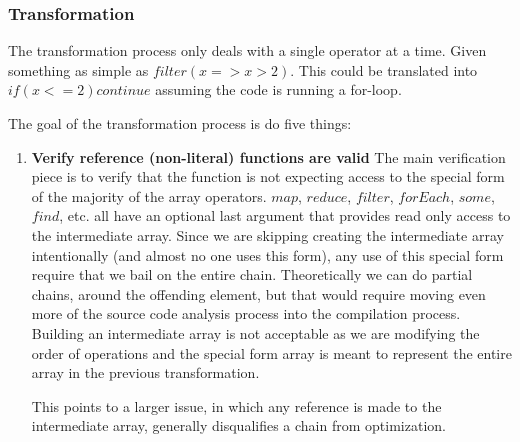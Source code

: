 \subsubsection{Transformation}

The transformation process only deals with a single operator at a time.  Given something as simple as $filter(x => x > 2)$.  This could be translated into $if (x <= 2) continue$ assuming the code is running a for-loop.

The goal of the transformation process is do five things:
\begin{enumerate}
  \item \textbf{Verify reference (non-literal) functions are valid}
    The main verification piece is to verify that the function is not expecting access to the special
    form of the majority of the array operators.  $map$, $reduce$, $filter$, $forEach$, $some$, $find$, etc.  all have an optional last argument that provides read only access to the intermediate array.  Since we are skipping creating the intermediate array intentionally (and almost no one uses this form), any use of this special form require that we bail on the entire chain. Theoretically we can do partial chains, around the offending element, but that would require moving even more of the source code analysis process into the compilation process.  Building an intermediate array is not acceptable  as we are modifying the order of operations and the special form array is meant to represent the entire array in the previous transformation.

    This points to a larger issue, in which any reference is made to the intermediate array, generally disqualifies a chain from optimization.
  

\end{enumerate}

